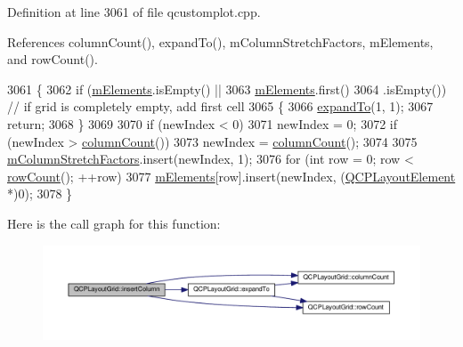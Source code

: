Definition at line 3061 of file qcustomplot.\+cpp.



References column\+Count(), expand\+To(), m\+Column\+Stretch\+Factors, m\+Elements, and row\+Count().


\begin{DoxyCode}
3061                                              \{
3062   \textcolor{keywordflow}{if} (\hyperlink{class_q_c_p_layout_grid_a2ec4664bcfb5d479255e50f0c074f7c9}{mElements}.isEmpty() ||
3063       \hyperlink{class_q_c_p_layout_grid_a2ec4664bcfb5d479255e50f0c074f7c9}{mElements}.first()
3064           .isEmpty()) \textcolor{comment}{// if grid is completely empty, add first cell}
3065   \{
3066     \hyperlink{class_q_c_p_layout_grid_a886c0dcbabd51a45da399e044552b685}{expandTo}(1, 1);
3067     \textcolor{keywordflow}{return};
3068   \}
3069 
3070   \textcolor{keywordflow}{if} (newIndex < 0)
3071     newIndex = 0;
3072   \textcolor{keywordflow}{if} (newIndex > \hyperlink{class_q_c_p_layout_grid_ac39074eafd148b82d0762090f258189e}{columnCount}())
3073     newIndex = \hyperlink{class_q_c_p_layout_grid_ac39074eafd148b82d0762090f258189e}{columnCount}();
3074 
3075   \hyperlink{class_q_c_p_layout_grid_ac6aabe62339f94f18b9f8adab94b1840}{mColumnStretchFactors}.insert(newIndex, 1);
3076   \textcolor{keywordflow}{for} (\textcolor{keywordtype}{int} row = 0; row < \hyperlink{class_q_c_p_layout_grid_af8e6c7a05864ebe610c87756c7b9079c}{rowCount}(); ++row)
3077     \hyperlink{class_q_c_p_layout_grid_a2ec4664bcfb5d479255e50f0c074f7c9}{mElements}[row].insert(newIndex, (\hyperlink{class_q_c_p_layout_element}{QCPLayoutElement} *)0);
3078 \}
\end{DoxyCode}


Here is the call graph for this function\+:\nopagebreak
\begin{figure}[H]
\begin{center}
\leavevmode
\includegraphics[width=350pt]{class_q_c_p_layout_grid_a1e880a321dbe8b43b471ccd764433dc4_cgraph}
\end{center}
\end{figure}


\hypertarget{class_q_c_p_layout_grid_a48af3dd7c3a653d9c3d7dd99bd02e838}{}
